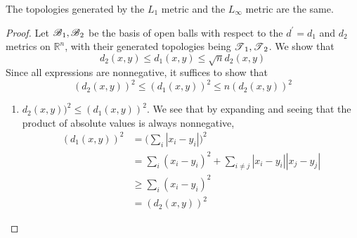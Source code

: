       \begin{theorem} 
        The topologies generated by the $L_1$ metric and the $L_\infty$ metric are the same. 
      \end{theorem} 
      \begin{proof}
        Let $\B_1, \B_2$ be the basis of open balls with respect to the $d^\prime = d_1$ and $d_2$ metrics on $\mathbb{R}^n$, with their generated topologies being $\T_1, \T_2$. We show that 
        \begin{equation}
          d_2 (x, y) \leq d_1 (x, y) \leq \sqrt{n} d_2 (x, y)
        \end{equation} 
        Since all expressions are nonnegative, it suffices to show that 
        \begin{equation}
          (d_2 (x, y))^2 \leq (d_1 (x, y))^2 \leq n (d_2 (x, y))^2
        \end{equation} 
        \begin{enumerate}
          \item $d_2 (x, y))^2 \leq (d_1 (x, y))^2$. We see that by expanding and seeing that the product of absolute values is always nonnegative, 
          \begin{align}
            (d_1 (x, y))^2 & = \bigg( \sum_i |x_i - y_i| \bigg)^2 \\
                           & = \sum_i (x_i - y_i)^2 + \sum_{i \neq j} |x_i - y_i| |x_j - y_j| \\ 
                           & \geq \sum_i (x_i - y_i)^2 \\
                           & = (d_2 (x, y))^2
          \end{align}


\end{enumerate}
\end{proof}

